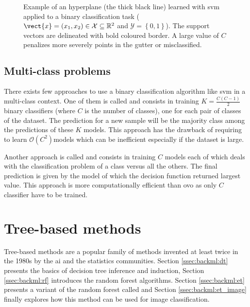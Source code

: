 \begin{figure}
  \centering
  \caption{Example of an hyperplane (the thick black line) learned with \acrshort{svm} applied to a binary classification task ($\vect{x} = (x_1, x_2) \in \mathcal{X} \subseteq \mathbb{R}^2$ and $\mathcal{Y} = \left\{0, 1\right\}$). The support vectors are delineated with bold coloured border. A large value of $C$ penalizes more severely points in the gutter or misclassified.}
  \label{fig:backml:svm}
\end{figure}


\subsection{Multi-class problems}

There exists few approaches to use a binary classification algorithm like \acrshort{svm} in a multi-class context. One of them is called  and consists in training $K=\frac{C(C-1)}{2}$ binary classifiers (where $C$ is the number of classes), one for each pair of classes of the dataset. The prediction for a new sample will be the majority class among the predictions of these $K$ models. This approach has the drawback of requiring to learn $\mathcal{O}(C^2)$models which can be inefficient especially if the dataset is large.

Another approach is called  and consists in training $C$ models each of which deals with the classification problem of a class versus all the others. The final prediction is given by the model of which the decision function returned largest value. This approach is more computationally efficient than \acrshort{ovo} as only $C$ classifier have to be trained.

\section{Tree-based methods}
\label{sec:backml:treebased}

Tree-based methods are a popular family of methods invented at least twice in the 1980s by the \acrshort{ai} \parencite{quinlan1986induction} and the statistics \parencite{breiman2017classification} communities. Section \ref{ssec:backml:dt} presents the basics of decision tree inference and induction, Section \ref{ssec:backml:rf} introduces the random forest algorithms. Section \ref{ssec:backml:et} presents a variant of the random forest called  and Section \ref{ssec:backml:et_image} finally explores how this method can be used for image classification.

